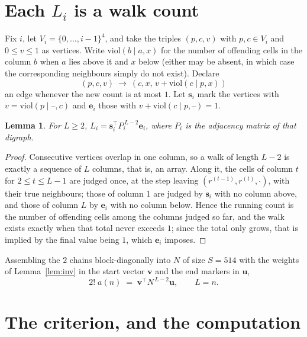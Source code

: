 \documentclass[11pt,a4paper]{article}
\theoremstyle{plain}
\newtheorem{lemma}[theorem]{Lemma}
\theoremstyle{definition}
\begin{document}
\section{Each $L_i$ is a walk count}

Fix $i$, let $V_i=\{0,\dots,i-1\}^{4}$, and take the triples $(p,c,v)$ with
$p,c\in V_i$ and $0\le v\le1$ as vertices. Write $\mathrm{viol}(b\mid a,x)$ for the number
of offending cells in the column $b$ when $a$ lies above it and $x$ below (either may be
absent, in which case the corresponding neighbours simply do not exist). Declare
\[
(p,c,v)\ \longrightarrow\ (c,x,\,v+\mathrm{viol}(c\mid p,x))
\]
an edge whenever the new count is at most $1$. Let $\mathbf{s}_i$ mark the vertices with
$v=\mathrm{viol}(p\mid\text{--},c)$ and $\mathbf{e}_i$ those with
$v+\mathrm{viol}(c\mid p,\text{--})=1$.

\begin{lemma}\label{lem:walk}
For $L\ge2$, $L_i=\mathbf{s}_i^{\!\top}P_i^{\,L-2}\mathbf{e}_i$, where $P_i$ is the
adjacency matrix of that digraph.
\end{lemma}

\begin{proof}
Consecutive vertices overlap in one column, so a walk of length $L-2$ is exactly a sequence
of $L$ columns, that is, an array. Along it, the cells of column $t$ for $2\le t\le L-1$ are
judged once, at the step leaving $(r^{(t-1)},r^{(t)},\cdot)$, with their true neighbours;
those of column $1$ are judged by $\mathbf{s}_i$ with no column above, and those of column
$L$ by $\mathbf{e}_i$ with no column below. Hence the running count is the number of
offending cells among the columns judged so far, and the walk exists exactly when that total
never exceeds $1$; since the total only grows, that is implied by the final value being
$1$, which $\mathbf{e}_i$ imposes.
\end{proof}

Assembling the $2$ chains block-diagonally into $N$ of size $S=514$ with the weights of
Lemma~\ref{lem:inv} in the start vector $\mathbf{v}$ and the end markers in
$\mathbf{u}$,
\begin{equation}\label{eq:walk2}
2!\;a(n)\;=\;\mathbf{v}^{\!\top}N^{\,L-2}\mathbf{u},\qquad L=n .
\end{equation}

\section{The criterion, and the computation}
\end{document}

